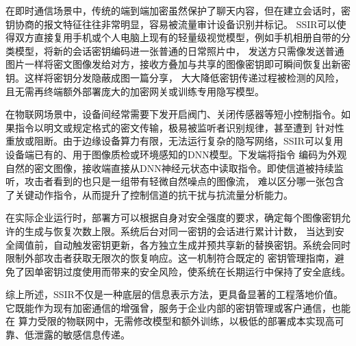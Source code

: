 在即时通信场景中，传统的端到端加密虽然保护了聊天内容，但在建立会话时，密钥协商的报文特征往往非常明显，容易被流量审计设备识别并标记。
SSIR可以使得双方直接复用手机或个人电脑上现有的轻量级视觉模型，例如手机相册自带的分类模型，将新的会话密钥编码进一张普通的日常照片中，
发送方只需像发送普通图片一样将密文图像发给对方，接收方叠加与共享的图像密钥即可瞬间恢复出新密钥。这样将密钥分发隐蔽成图一篇分享，
大大降低密钥传递过程被检测的风险，且无需再终端额外部署庞大的加密网关或训练专用隐写模型。

在物联网场景中，设备间经常需要下发开启阀门、关闭传感器等短小控制指令。如果指令以明文或规定格式的密文传输，极易被监听者识别规律，甚至遭到
针对性重放或阻断。由于边缘设备算力有限，无法运行复杂的隐写网络，SSIR可以复用设备端已有的、用于图像质检或环境感知的DNN模型。下发端将指令
编码为外观自然的密文图像，接收端直接从DNN神经元状态中读取指令。即使信道被持续监听，攻击者看到的也只是一组带有轻微自然噪点的图像流，
难以区分哪一张包含了关键动作指令，从而提升了控制信道的抗干扰与抗流量分析能力。

在实际企业运行时，部署方可以根据自身对安全强度的要求，确定每个图像密钥允许的生成与恢复次数上限。系统后台对同一密钥的会话进行累计计数，
当达到安全阈值前，自动触发密钥更新，各方独立生成并预共享新的替换密钥。系统会同时限制外部攻击者获取无限次的恢复响应。这一机制符合既定的
密钥管理指南，避免了因单密钥过度使用而带来的安全风险，使系统在长期运行中保持了安全底线。

综上所述，SSIR不仅是一种底层的信息表示方法，更具备显著的工程落地价值。它既能作为现有加密通信的增强曾，服务于企业内部的密钥管理或客户通信，也能在
算力受限的物联网中，无需修改模型和额外训练，以极低的部署成本实现高可靠、低泄露的敏感信息传递。